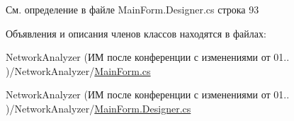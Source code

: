 См. определение в файле Main\+Form.\+Designer.\+cs строка 93



Объявления и описания членов классов находятся в файлах\+:\begin{DoxyCompactItemize}
\item 
Network\+Analyzer (ИМ после конференции  с изменениями от 01.. )/\+Network\+Analyzer/\hyperlink{_main_form_8cs}{Main\+Form.\+cs}\item 
Network\+Analyzer (ИМ после конференции  с изменениями от 01.. )/\+Network\+Analyzer/\hyperlink{_main_form_8_designer_8cs}{Main\+Form.\+Designer.\+cs}\end{DoxyCompactItemize}
